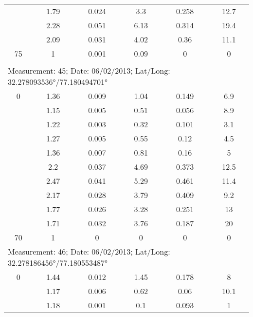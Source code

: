 \begin{longtable}{cccccc}
		& 1.79  & 0.024 & 3.3   & 0.258 & 12.7 \\
		
		& 2.28  & 0.051 & 6.13  & 0.314 & 19.4 \\
		
		& 2.09  & 0.031 & 4.02  & 0.36  & 11.1 \\
		
		75    & 1     & 0.001 & 0.09  & 0     & 0 \\ \\

		\multicolumn{6}{l}{Measurement: 45; Date: 06/02/2013;
			Lat/Long: 32.278093536°/77.180494701°} \\		
		\midrule
		0     & 1.36  & 0.009 & 1.04  & 0.149 & 6.9 \\
		
		& 1.15  & 0.005 & 0.51  & 0.056 & 8.9 \\
		
		& 1.22  & 0.003 & 0.32  & 0.101 & 3.1 \\
		
		& 1.27  & 0.005 & 0.55  & 0.12  & 4.5 \\
		
		& 1.36  & 0.007 & 0.81  & 0.16  & 5 \\
		
		& 2.2   & 0.037 & 4.69  & 0.373 & 12.5 \\
		
		& 2.47  & 0.041 & 5.29  & 0.461 & 11.4 \\
		
		& 2.17  & 0.028 & 3.79  & 0.409 & 9.2 \\
		
		& 1.77  & 0.026 & 3.28  & 0.251 & 13 \\
		
		& 1.71  & 0.032 & 3.76  & 0.187 & 20 \\
		
		70    & 1     & 0     & 0     & 0     & 0 \\
		\midrule
		\multicolumn{6}{l}{Measurement: 46; Date: 06/02/2013;
			Lat/Long: 32.278186456°/77.180553487°} \\		
		\midrule
		0     & 1.44  & 0.012 & 1.45  & 0.178 & 8 \\
		
		& 1.17  & 0.006 & 0.62  & 0.06  & 10.1 \\
		
		& 1.18  & 0.001 & 0.1   & 0.093 & 1 \\
		

\end{longtable}
